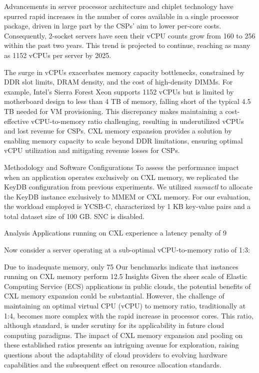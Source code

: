 Advancements in server processor architecture and chiplet technology have spurred rapid increases in the number of cores available in a single processor package, driven in large part by the CSPs' aim to lower per-core costs. Consequently, 2-socket servers have seen their vCPU counts grow from 160 to 256 within the past two years. This trend is projected to continue, reaching as many as 1152 vCPUs per server by 2025.

The surge in vCPUs exacerbates memory capacity bottlenecks, constrained by DDR slot limits, DRAM density, and the cost of high-density DIMMs. For example, Intel's Sierra Forest Xeon supports 1152 vCPUs but is limited by motherboard design to less than 4 TB of memory, falling short of the typical 4.5 TB needed for VM provisioning. This discrepancy makes maintaining a cost-effective vCPU-to-memory ratio challenging, resulting in underutilized vCPUs and lost revenue for CSPs. CXL memory expansion provides a solution by enabling memory capacity to scale beyond DDR limitations, ensuring optimal vCPU utilization and mitigating revenue losses for CSPs.

Methodology and Software Configurations
To assess the performance impact when an application operates exclusively on CXL memory, we replicated the KeyDB configuration from previous experiments. We utilized \textit{numactl} to allocate the KeyDB instance exclusively to MMEM or CXL memory. For our evaluation, the workload employed is YCSB-C, characterized by 1 KB key-value pairs and a total dataset size of 100 GB. SNC is disabled.

Analysis
Applications running on CXL experience a latency penalty of 9%

Now consider a server operating at a sub-optimal vCPU-to-memory ratio of 1:3:

Due to inadequate memory, only 75%
Our benchmarks indicate that instances running on CXL memory perform 12.5%
Insights
Given the sheer scale of Elastic Computing Service (ECS) applications in public clouds, the potential benefits of CXL memory expansion could be substantial. However, the challenge of maintaining an optimal virtual CPU (vCPU) to memory ratio, traditionally at 1:4, becomes more complex with the rapid increase in processor cores. This ratio, although standard, is under scrutiny for its applicability in future cloud computing paradigms. The impact of CXL memory expansion and pooling on these established ratios presents an intriguing avenue for exploration, raising questions about the adaptability of cloud providers to evolving hardware capabilities and the subsequent effect on resource allocation standards.


